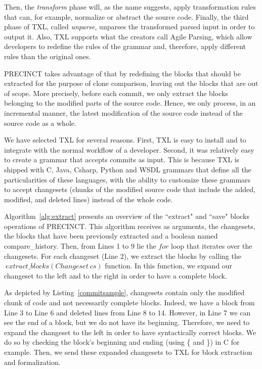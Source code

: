 \documentclass[conference]{IEEEtran}
\begin{document}
Then, the \textit{transform} phase will, as the name suggests, apply transformation rules that can, for example, normalize or abstract the source code. Finally, the third phase of TXL,  called \textit{unparse}, unparses the transformed parsed input in order to output it.
Also, TXL supports what the creators call Agile Parsing\cite{Dean}, which allow developers to redefine the rules of the grammar and, therefore, apply different rules than the original ones.


PRECINCT takes advantage of that by redefining the blocks that should be extracted for the purpose of clone comparison, leaving out the  blocks that are out of scope.
More precisely, before each commit, we only extract the blocks belonging to the modified parts of the source code.
Hence, we only process, in an incremental manner, the latest modification of the source code instead of the source code as a whole.

We have selected TXL for several reasons. First, TXL is easy to install and to integrate with the normal workflow of a developer.
Second, it was relatively easy to create a grammar that accepts commits as input.
This is because TXL is shipped with C, Java, Csharp, Python and WSDL grammars that define all the particularities of these languages, with the ability to customize these grammars to accept changesets (chunks of the modified source code that include the added, modified, and deleted lines) instead of the whole code.



Algorithm~\ref{alg:extract} presents an overview of the ``extract" and ``save" blocks operations of PRECINCT. This algorithm receives as arguments, the changesets, the blocks that have been previously extracted and a boolean named compare\_history.
Then, from Lines 1 to 9 lie the $for$ loop that iterates over the changesets. For each changeset (Line 2), we extract the blocks by calling the $~extract\_blocks(Changeset~cs)$ function.
In this function, we expand our changeset to the left and to the right in order to have a complete block.

As depicted by Listing~\ref{commitsample}, changesets contain only the modified chunk of code and not necessarily complete blocks. Indeed, we have a block from Line 3 to Line 6 and deleted lines from Line 8 to 14.
However, in Line 7 we can see the end of a block, but we do not have its beginning. Therefore, we need to expand the changeset to the left in order to have syntactically correct blocks.
We do so by checking the block's beginning and ending (using \{ and \}) in C for example.
Then, we send these expanded changesets to TXL for block extraction and formalization.
\end{document}
